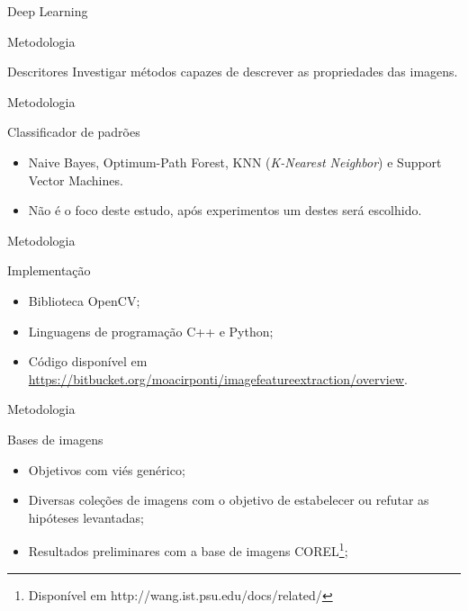 \documentclass{beamer}
\begin{document}
\begin{frame}{Deep Learning}
\begin{frame}{Metodologia}
\begin{block}{Descritores}
\justifying
Investigar métodos capazes de descrever as propriedades das imagens.
\end{block}
\end{frame}
\begin{frame}{Metodologia}
\begin{block}{Classificador de padrões}
\justifying
\begin{itemize}
\item Naive Bayes, Optimum-Path Forest, KNN (\textit{K-Nearest Neighbor}) e Support Vector Machines. %
\item Não é o foco deste estudo, após experimentos um destes será escolhido.
\end{itemize}
\end{block}
\end{frame}
\begin{frame}{Metodologia}
\begin{block}{Implementação}
\justifying
\begin{itemize}
\item Biblioteca OpenCV; %
\item Linguagens de programação C++ e Python;
\item Código disponível em \url{https://bitbucket.org/moacirponti/imagefeatureextraction/overview}. 
\end{itemize}
\end{block}
\end{frame}
\begin{frame}{Metodologia}
\begin{block}{Bases de imagens}
\justifying

\begin{itemize}
\item Objetivos com viés genérico;
\item Diversas coleções de imagens com o objetivo de estabelecer ou refutar as hipóteses levantadas;
\item Resultados preliminares com a base de imagens COREL\footnote{Disponível em http://wang.ist.psu.edu/docs/related/};
\end{itemize}
\end{block}
 

\end{frame}
\end{frame}
\end{document}
